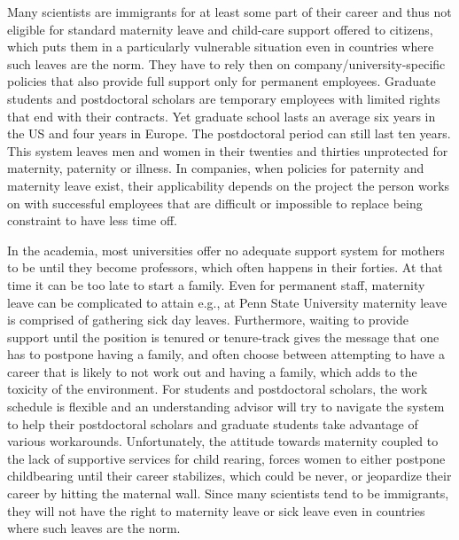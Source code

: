 \documentclass[utf8]{frontiersSCNS} %
\begin{document}
Many scientists are immigrants for at least some part of their career and thus not eligible for standard maternity leave and child-care support offered to citizens, which puts them in a particularly vulnerable situation even in countries where such leaves are the norm. They have to rely then on company/university-specific policies that also provide full support only for permanent employees. Graduate students and postdoctoral scholars are temporary employees with limited rights that end with their contracts. Yet graduate school lasts an average six years in the US and four years in Europe. The postdoctoral period can still last ten years. This system leaves men and women in their twenties and thirties unprotected for maternity, paternity or illness. In companies, when policies for paternity and maternity leave exist, their applicability depends on the project the person works on with successful employees that are difficult or impossible to replace being constraint to have less time off.

In the academia, most universities offer no adequate support system for mothers to be until they become professors, which often happens in their forties. At that time it can be too late to start a family.  Even for permanent staff, maternity leave can be complicated to attain e.g., at Penn State University maternity leave is comprised of gathering sick day leaves.  Furthermore, waiting to provide support until the position is tenured or tenure-track gives the message that one has to postpone having a family, and often choose between attempting to have a career that is likely to not work out and having a family, which adds to the toxicity of the environment.  For students and postdoctoral scholars, the work schedule is flexible and an understanding advisor will try to navigate the system to help their postdoctoral scholars and graduate students take advantage of various workarounds. Unfortunately, the attitude towards maternity coupled to the lack of supportive services for child rearing, forces women to either postpone childbearing until their career stabilizes, which could be never, or jeopardize their career by hitting the maternal wall. Since many scientists tend to be immigrants, they will not have the right to maternity leave or sick leave even in countries where such leaves are the norm. 
\end{document}

